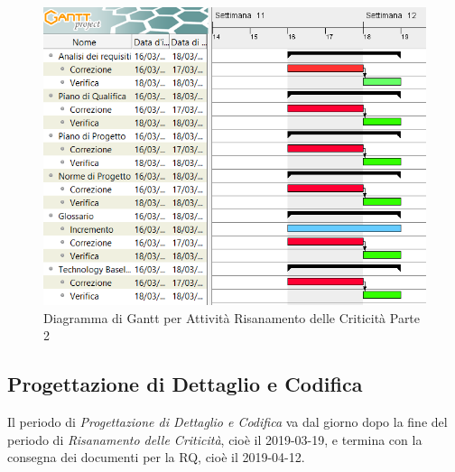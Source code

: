 \begin{figure}[h]
	\centering
  		\includegraphics[width=1.0\linewidth]{./images/RisanamentoCriticita2.png}
  		\caption{Diagramma di Gantt per Attività Risanamento delle Criticità Parte 2}
  		\label{fig:Gantt Risananmento Criticità 2}
\end{figure}

\newpage
\subsection{Progettazione di Dettaglio e Codifica}
Il periodo di \textit{Progettazione di Dettaglio e Codifica} va dal giorno dopo la fine del periodo di \textit{Risanamento delle Criticità}, cioè il 2019-03-19, e termina con la consegna dei documenti per la RQ, cioè il 2019-04-12.\\

